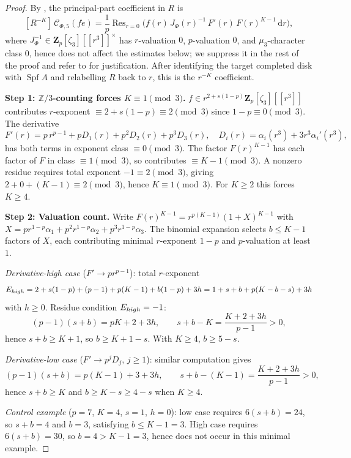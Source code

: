 \documentclass[10pt,a4paper]{amsart}
\newcommand{\Res}{\operatorname{Res}}
\newcommand{\Z}{\mathbf{Z}}
\newcommand{\dd}{\mathrm{d}}
\begin{document}
\begin{proof}
By , the principal-part coefficient in $R$ is
\begin{equation}\label{eq:residue-formula}
[R^{-K}]\,\mathcal C_{\Phi,5}(fe)=\frac{1}{p}\Res_{r=0}\!\bigl(f(r)\,J_\Phi(r)^{-1}\,F'(r)\,F(r)^{K-1}\,\dd r\bigr),
\end{equation}
where $J_\Phi^{-1}\in\Z_p[\zeta_3][[r^3]]^\times$ has $r$-valuation $0$, $p$-valuation $0$, and $\mu_3$-character class $0$, hence does not affect the estimates below; we suppress it in the rest of the proof and refer to  for justification. After identifying the target completed disk with $\operatorname{Spf}A$ and relabelling $R$ back to $r$, this is the $r^{-K}$ coefficient.

\medskip\noindent\textbf{Step 1: $\mathbb Z/3$-counting forces $K\equiv 1\pmod 3$.}\quad
$f\in r^{2+s(1-p)}\Z_p[\zeta_3][[r^3]]$ contributes $r$-exponent $\equiv 2+s(1-p)\equiv 2\pmod 3$ since $1-p\equiv 0\pmod 3$. The derivative
\[
F'(r)=p\,r^{p-1}+pD_1(r)+p^2D_2(r)+p^3D_3(r),\quad D_i(r)=\alpha_i(r^3)+3r^3\alpha_i'(r^3),
\]
has both terms in exponent class $\equiv 0\pmod 3$. The factor $F(r)^{K-1}$ has each factor of $F$ in class $\equiv 1\pmod 3$, so contributes $\equiv K-1\pmod 3$. A nonzero residue requires total exponent $-1\equiv 2\pmod 3$, giving $2+0+(K-1)\equiv 2\pmod 3$, hence $K\equiv 1\pmod 3$. For $K\ge 2$ this forces $K\ge 4$.

\medskip\noindent\textbf{Step 2: Valuation count.}\quad
Write $F(r)^{K-1}=r^{p(K-1)}(1+X)^{K-1}$ with $X=pr^{1-p}\alpha_1+p^2r^{1-p}\alpha_2+p^3r^{1-p}\alpha_3$. The binomial expansion selects $b\le K-1$ factors of $X$, each contributing minimal $r$-exponent $1-p$ and $p$-valuation at least $1$.

\emph{Derivative-high case} ($F'\to pr^{p-1}$): total $r$-exponent
\[
E_{\rm high}=2+s(1-p)+(p-1)+p(K-1)+b(1-p)+3h=1+s+b+p(K-b-s)+3h
\]
with $h\ge 0$. Residue condition $E_{\rm high}=-1$:
\[
(p-1)(s+b)=pK+2+3h,\qquad s+b-K=\frac{K+2+3h}{p-1}>0,
\]
hence $s+b\ge K+1$, so $b\ge K+1-s$. With $K\ge 4$, $b\ge 5-s$.

\emph{Derivative-low case} ($F'\to p^jD_j$, $j\ge 1$): similar computation gives
\[
(p-1)(s+b)=p(K-1)+3+3h,\qquad s+b-(K-1)=\frac{K+2+3h}{p-1}>0,
\]
hence $s+b\ge K$ and $b\ge K-s\ge 4-s$ when $K\ge 4$.

\emph{Control example} ($p=7$, $K=4$, $s=1$, $h=0$): low case requires $6(s+b)=24$, so $s+b=4$ and $b=3$, satisfying $b\le K-1=3$. High case requires $6(s+b)=30$, so $b=4>K-1=3$, hence does not occur in this minimal example.


\end{proof}
\end{document}
